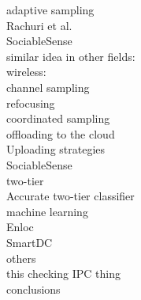 adaptive sampling\\
	Rachuri et al. \cite{rachuri:dynamicsensing}\\
	SociableSense \cite{rachuri:socialsense} \\
	similar idea in other fields:\\
		wireless:\\
			channel sampling \cite{deshpande:channeling}\\
			refocusing \cite{deshpande:refocusing}\\
			coordinated sampling \cite{deshpande:coordinated}\\

offloading to the cloud\\
	Uploading strategies \cite{musolesi:offloading}\\
	SociableSense \cite{rachuri:socialsense} \\
	
two-tier\\
	Accurate two-tier classifier \cite{srinivasan:twotier}\\

machine learning\\
	Enloc \cite{constandache:enloc}\\
	SmartDC \cite{chon:smartdc}\\

others\\
	this checking IPC thing\\

conclusions
